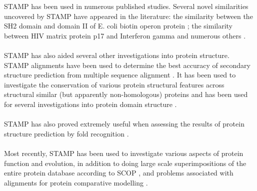     STAMP has been used in numerous published studies.  
    Several novel similarities uncovered by STAMP have appeared 
    in the literature: the similarity between the SH2 domain 
    and domain II of E. coli biotin operon protein \cite{rb93b}; the 
    similarity between HIV matrix protein p17 and Interferon 
    gamma \cite{matthews94} and numerous others \cite{russell94,russell96,russell97a}.\\
    \\
    STAMP has also aided several other investigations 
    into protein structure.  STAMP alignments have been used to 
    determine the best accuracy of secondary structure prediction 
    from multiple sequence alignment \cite{rb93c}. It has been used to 
    investigate the conservation of various protein structural features 
    across  structural similar (but apparently non-homologous) proteins 
    \cite{rb94,russell97b} and has been used for several investigations into protein domain 
    structure \cite{russell94,sternberg95,siddiqui95}.\\
    \\
    STAMP has also proved extremely useful when assessing the results of
    protein structure prediction by fold recognition 
    \cite{rcb95a,rcb96,russell98b}.\\
    \\
    Most recently, STAMP has been used to investigate various aspects of protein function 
    and evolution, in addition to doing large scale superimpositions of the entire
    protein database according to SCOP \cite{russell97b,russell98a}, and problems
    associated with alignments for protein comparative modelling 
    \cite{saqi98}.

    \nocite{TitlesOn}
    
    

    










